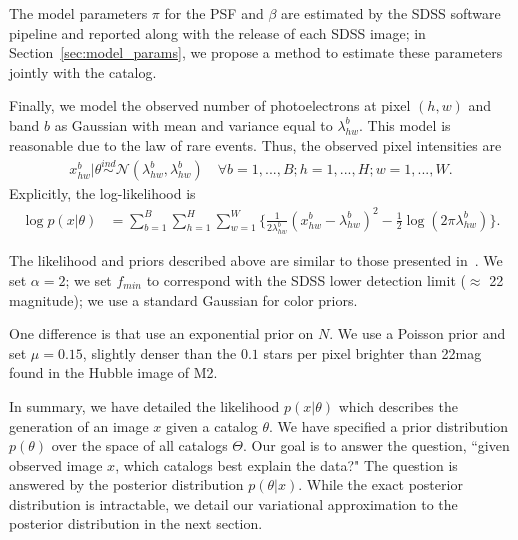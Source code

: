 The model parameters $\pi$ for the PSF and $\beta$ are estimated by the SDSS software pipeline and reported along with the release of each SDSS image; in Section~\ref{sec:model_params}, we propose a method to estimate these parameters jointly with the catalog. 

Finally, we model the observed number of photoelectrons at pixel $(h,w)$ and band $b$ as Gaussian
with mean and variance equal to $\lambda^b_{hw}$. This model is reasonable due to the law of rare events.
Thus, the observed pixel intensities are
\begin{align}
  x_{hw}^b | \theta \overset{ind}{\sim} \mathcal{N}(\lambda^b_{hw}, \lambda^b_{hw})
  \quad\forall b = 1, ..., B; h = 1,..., H; w = 1, ..., W. 
\end{align}
Explicitly, the log-likelihood is
\begin{align}
    \log p(x | \theta) &= \sum_{b = 1}^{B} \sum_{h = 1}^H \sum_{w = 1}^W 
        \Big\{\frac{1}{2\lambda^b_{hw}}(x_{hw}^b  - \lambda^b_{hw})^2 - 
               \frac{1}{2}\log(2\pi\lambda^b_{hw})\Big\}
    \label{eq:loglik}.
\end{align}

The likelihood and priors described above are similar to those
presented in~\cite{Portillo_2017, Feder_2019}. We set $\alpha = 2$; we set 
$f_{min}$ to correspond with the SDSS 
lower detection limit ($\approx$ 22 magnitude); we use a standard Gaussian for color priors. 

One difference is that \cite{Portillo_2017, Feder_2019} use an exponential prior on $N$. We use a Poisson prior and set $\mu = 0.15$, slightly denser than the $0.1$ stars per pixel 
brighter than 22mag found in the Hubble image of M2. 

In summary, we have detailed the likelihood
$p(x | \theta)$ which describes the generation of an image $x$ given a catalog $\theta$. We have specified a prior distribution $p(\theta)$ over the space 
of all catalogs $\Theta$. 
Our goal is to answer the question, ``given observed image $x$, which 
catalogs best explain the data?"
The question is answered by the posterior distribution $p(\theta | x)$. While 
the exact posterior distribution is intractable, we detail our variational approximation to the posterior distribution in the next section. 